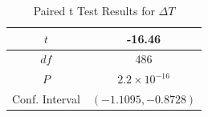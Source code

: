 \begin{table}[ht]
 \begin{centering}
 \begin{tabular}{|c|c|} 
 \hline
  $t$ & -16.46 \\ 
 \hline
 $df$ & 486 \\
  \hline
 $P$ & $2.2 \times 10^{-16}$ \\ 
  \hline
 Conf. Interval & $(-1.1095, -0.8728)$ \\ 
 \hline
 \end{tabular}
 \caption{Paired t Test Results for $\Delta T$}
 \label{tab:lin_regression2}
 \end{centering}
\end{table}